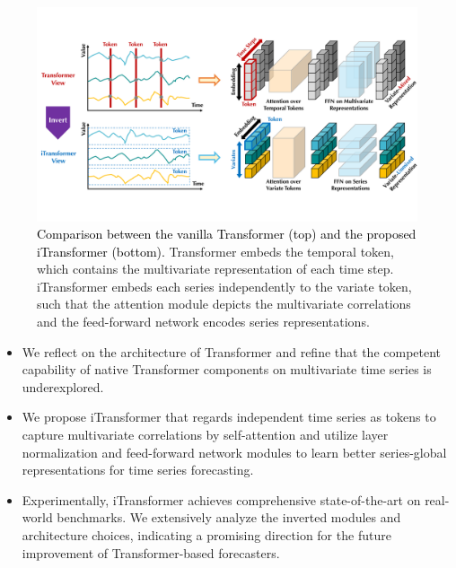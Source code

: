 \documentclass[twoside,12pt]{article}
\newcommand{\update}[1]{{\textcolor{black}{#1}}}
\begin{document}
\begin{figure}[t]
  \begin{center}
    \includegraphics[width=0.95\columnwidth]{pic/motivation.pdf}
    \vspace{-10pt}
    \caption{\small{\update{Comparison between the vanilla Transformer (top) and the proposed iTransformer (bottom).} Transformer embeds the temporal token, which contains the multivariate representation of each time step. iTransformer embeds each series independently to the variate token, such that the attention module depicts the multivariate correlations and the feed-forward network encodes series representations.}}
    \label{fig:motivation}
  \end{center}
  \vspace{-14pt}
\end{figure}

\begin{itemize}
  \item We reflect on the architecture of Transformer and refine that the competent capability of native Transformer components on multivariate time series is underexplored.
  \item We propose iTransformer that regards independent time series as tokens to capture multivariate correlations by self-attention and utilize layer normalization and feed-forward network modules to learn better series-global representations for time series forecasting.
  \item Experimentally, iTransformer achieves comprehensive state-of-the-art on real-world benchmarks. We extensively analyze the inverted modules and architecture choices, indicating a promising direction for the future improvement of Transformer-based forecasters.
\end{itemize}




\vfill
\end{document}
